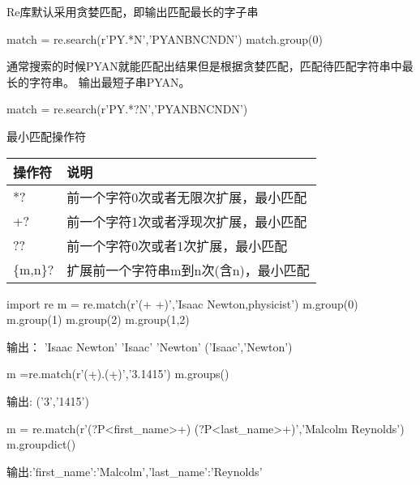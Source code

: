 Re库默认采用贪婪匹配，即输出匹配最长的字子串
\begin{python}
match = re.search(r'PY.*N','PYANBNCNDN')
match.group(0)
\end{python}
通常搜索的时候PYAN就能匹配出结果但是根据贪婪匹配，匹配待匹配字符串中最长的字符串。
输出最短子串PYAN。
\begin{python}
match = re.search(r'PY.*?N','PYANBNCNDN')
\end{python}
最小匹配操作符\newline
\begin{tabular}{|l|l|}
\hline
操作符&说明\\
\hline
*?&前一个字符0次或者无限次扩展，最小匹配\\
\hline
+?&前一个字符1次或者浮现次扩展，最小匹配\\
\hline
??&前一个字符0次或者1次扩展，最小匹配\\
\hline
\{m,n\}?&扩展前一个字符串m到n次(含n)，最小匹配\\
\hline
\end{tabular}
\begin{python}
import re
m = re.match(r'(\w+ \w+)','Isaac Newton,physicist')
m.group(0)
m.group(1)
m.group(2)
m.group(1,2)
\end{python}
输出：\newline
'Isaac Newton'\newline
'Isaac' \newline
'Newton'\newline
('Isaac','Newton')\newline
\begin{python}
m =re.match(r'(\d+).(\d+)','3.1415')
m.groups()
\end{python}
输出:\newline
('3','1415')\newline
\begin{python}
m = re.match(r'(?P<first_name>\w+) (?P<last_name>\w+)','Malcolm Reynolds')
m.groupdict()
\end{python}
输出:{'first\_name':'Malcolm','last\_name':'Reynolds'}\newline
